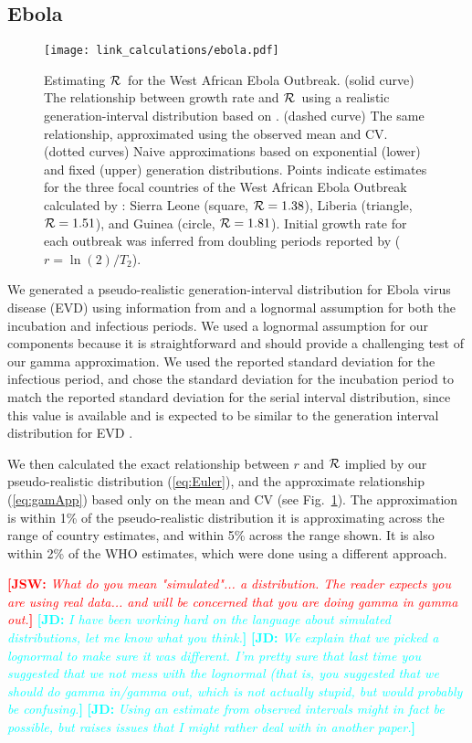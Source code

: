 \documentclass[12pt]{article}
\newcommand{\RR}{\ensuremath{{\cal R}}}
\newcommand{\eref}[1]{(\ref{eq:#1})}
\newcommand{\fref}[1]{Fig.~\ref{fig:#1}}
\newcommand{\comment}[3]{\textcolor{#1}{\textbf{[#2: }\textit{#3}\textbf{]}}}
\newcommand{\jd}[1]{\comment{cyan}{JD}{#1}}
\newcommand{\jsw}[1]{\comment{red}{JSW}{#1}}
\begin{document}
\subsection{Ebola}
\label{EbolaEx}

\begin{figure}[htbp] \centering
	\texttt{[image: link\_calculations/ebola.pdf]}
	\caption{Estimating \RR~for the West African Ebola Outbreak.
(solid curve) The relationship between growth rate and \RR~using a realistic generation-interval distribution based on \cite{AylwBarb14}.
(dashed curve) The same relationship, approximated using the observed mean and CV. 
(dotted curves) Naive approximations based on exponential (lower) and fixed (upper) generation distributions.
Points indicate estimates for the three focal countries of the West African Ebola Outbreak calculated by \cite{AylwBarb14}: {Sierra Leone (square, $\RR=1.38$), Liberia (triangle, $\RR=1.51$), and Guinea (circle, $\RR=1.81$).} Initial growth rate for each outbreak was inferred from doubling periods reported by \cite{AylwBarb14} ($r = \ln(2)/T_2$).
	\label{fig:EbolaCurve}}
\end{figure}

We generated a pseudo-realistic generation-interval distribution for Ebola virus disease (EVD) using information from \cite{AylwBarb14} and a lognormal assumption for both the incubation and infectious periods.
We used a lognormal assumption for our components because it is straightforward and should provide a challenging test of our gamma approximation. 
We used the reported standard deviation for the infectious period, and chose the standard deviation for the incubation period to match the reported standard deviation for the serial interval distribution, since this value is available and is expected to be similar to the generation interval distribution for EVD \cite{AylwBarb14}.

We then calculated the exact relationship between $r$ and $\RR$ implied by our pseudo-realistic distribution \eref{Euler}, and the approximate relationship \eref{gamApp} based only on the mean and CV (see \fref{EbolaCurve}). The approximation is within 1\% of the pseudo-realistic distribution it is approximating across the range of country estimates, and within 5\% across the range shown. It is also within 2\% of the WHO estimates, which were done using a different approach. 

\jsw{What do you mean "simulated"... a distribution. The reader expects you are using real data... and will be concerned that you are doing gamma in gamma out.}
\jd{I have been working hard on the language about simulated distributions, let me know what you think.}
\jd{We explain that we picked a lognormal to make sure it was different. I'm pretty sure that last time you suggested that we not mess with the lognormal (that is, you suggested that we \emph{should} do gamma in/gamma out, which is not actually stupid, but would probably be confusing.}
\jd{Using an estimate from observed intervals might in fact be possible, but raises issues that I might rather deal with in another paper.}
\end{document}
